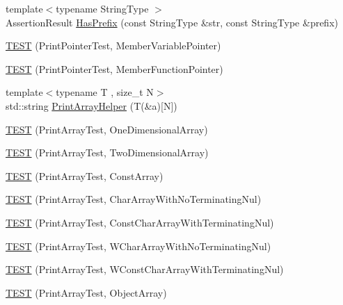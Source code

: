 \begin{DoxyCompactItemize}
\item 
{\footnotesize template$<$typename String\+Type $>$ }\\Assertion\+Result \mbox{\hyperlink{namespacetesting_1_1gtest__printers__test_abbd436200da6c80944c8a7504fb56ea1}{Has\+Prefix}} (const String\+Type \&str, const String\+Type \&prefix)
\item 
\mbox{\hyperlink{namespacetesting_1_1gtest__printers__test_a434cafcc1dbee409992bbb1593034480}{T\+E\+ST}} (Print\+Pointer\+Test, Member\+Variable\+Pointer)
\item 
\mbox{\hyperlink{namespacetesting_1_1gtest__printers__test_a9d998b210890d3d7e085d01c457f650f}{T\+E\+ST}} (Print\+Pointer\+Test, Member\+Function\+Pointer)
\item 
{\footnotesize template$<$typename T , size\+\_\+t N$>$ }\\std\+::string \mbox{\hyperlink{namespacetesting_1_1gtest__printers__test_a694f23c5a8c134f0e6e24a412f8d75c1}{Print\+Array\+Helper}} (T(\&a)\mbox{[}N\mbox{]})
\item 
\mbox{\hyperlink{namespacetesting_1_1gtest__printers__test_a3845c4717b03cb5ad309c7d9a37acb0a}{T\+E\+ST}} (Print\+Array\+Test, One\+Dimensional\+Array)
\item 
\mbox{\hyperlink{namespacetesting_1_1gtest__printers__test_ac366b9ec749b2499d21583d3b8f86273}{T\+E\+ST}} (Print\+Array\+Test, Two\+Dimensional\+Array)
\item 
\mbox{\hyperlink{namespacetesting_1_1gtest__printers__test_a8b5638f178c12f58707ca0f02a3b4d41}{T\+E\+ST}} (Print\+Array\+Test, Const\+Array)
\item 
\mbox{\hyperlink{namespacetesting_1_1gtest__printers__test_a3bae023a42049745b49fa1f2db9a0cb2}{T\+E\+ST}} (Print\+Array\+Test, Char\+Array\+With\+No\+Terminating\+Nul)
\item 
\mbox{\hyperlink{namespacetesting_1_1gtest__printers__test_ab51b9ecaca7d635326101b23d5e8afd2}{T\+E\+ST}} (Print\+Array\+Test, Const\+Char\+Array\+With\+Terminating\+Nul)
\item 
\mbox{\hyperlink{namespacetesting_1_1gtest__printers__test_ac19ec2732031bfe83b30ea9f00259ef3}{T\+E\+ST}} (Print\+Array\+Test, W\+Char\+Array\+With\+No\+Terminating\+Nul)
\item 
\mbox{\hyperlink{namespacetesting_1_1gtest__printers__test_a6a7cbcdbe748a1d4e90658f48f36c9da}{T\+E\+ST}} (Print\+Array\+Test, W\+Const\+Char\+Array\+With\+Terminating\+Nul)
\item 
\mbox{\hyperlink{namespacetesting_1_1gtest__printers__test_af91d8ad9d6c7547913fe05c7acc44114}{T\+E\+ST}} (Print\+Array\+Test, Object\+Array)

\end{DoxyCompactItemize}
